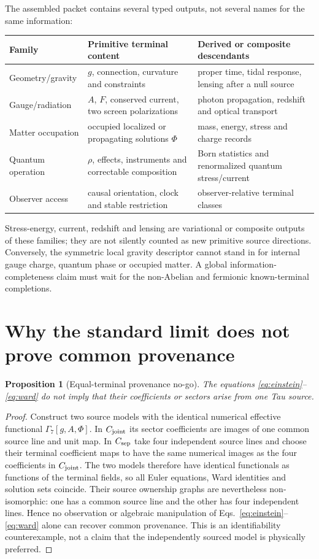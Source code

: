 \documentclass[11pt]{article}
\newtheorem{proposition}{Proposition}
\begin{document}
The assembled packet contains several typed outputs, not several names for
the same information:
\begin{center}
\small
\begin{tabularx}{0.96\textwidth}{@{}p{}Xp{}@{}}
\toprule
Family & Primitive terminal content & Derived or composite descendants\\
\midrule
Geometry/gravity & $g$, connection, curvature and constraints & proper time,
tidal response, lensing after a null source\\
Gauge/radiation & $A$, $F$, conserved current, two screen polarizations &
photon propagation, redshift and optical transport\\
Matter occupation & occupied localized or propagating solutions $\Phi$ &
mass, energy, stress and charge records\\
Quantum operation & $\rho$, effects, instruments and correctable composition &
Born statistics and renormalized quantum stress/current\\
Observer access & causal orientation, clock and stable restriction &
observer-relative terminal classes\\
\bottomrule
\end{tabularx}
\end{center}
Stress-energy, current, redshift and lensing are variational or composite
outputs of these families; they are not silently counted as new primitive
source directions. Conversely, the symmetric local gravity descriptor cannot
stand in for internal gauge charge, quantum phase or occupied matter. A global
information-completeness claim must wait for the non-Abelian and fermionic
known-terminal completions.

\section{Why the standard limit does not prove common provenance}

\begin{proposition}[Equal-terminal provenance no-go]
The equations \eqref{eq:einstein}--\eqref{eq:ward} do not imply that their
coefficients or sectors arise from one Tau source.
\end{proposition}
\begin{proof}
Construct two source models with the identical numerical effective functional
$\Gamma_7[g,A,\Phi]$.  In $C_{\rm joint}$ its sector coefficients are images
of one common source line and unit map.  In $C_{\rm sep}$ take four independent
source lines and choose their terminal coefficient maps to have the same
numerical images as the four coefficients in $C_{\rm joint}$.  The two models
therefore have identical functionals as functions of the terminal fields, so
all Euler equations, Ward identities and solution sets coincide.  Their
source ownership graphs are nevertheless non-isomorphic: one has a common
source line and the other has four independent lines.  Hence no observation
or algebraic manipulation of Eqs.~\eqref{eq:einstein}--\eqref{eq:ward} alone
can recover common provenance.  This is an identifiability counterexample,
not a claim that the independently sourced model is physically preferred.
\end{proof}
\end{document}
